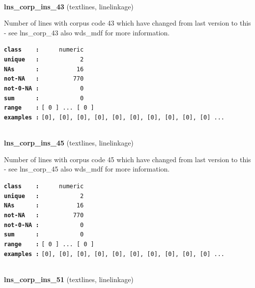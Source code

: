 \documentclass[]{article}
\begin{document}
~

\textbf{lns\_corp\_ins\_43} (textlines, linelinkage)

Number of lines with corpus code 43 which have changed from last version
to this - see lns\_corp\_43 also wds\_mdf for more information.

\textbf{\texttt{class\ \ \ \ :}} \texttt{~~~~~numeric}\\
\textbf{\texttt{unique\ \ \ :}} \texttt{~~~~~~~~~~~2}\\
\textbf{\texttt{NAs\ \ \ \ \ \ :}} \texttt{~~~~~~~~~~16}\\
\textbf{\texttt{not-NA\ \ \ :}} \texttt{~~~~~~~~~770}\\
\textbf{\texttt{not-0-NA\ :}} \texttt{~~~~~~~~~~~0}\\
\textbf{\texttt{sum\ \ \ \ \ \ :}} \texttt{~~~~~~~~~~~0}\\
\textbf{\texttt{range\ \ \ \ :}}
\texttt{{[}\ 0\ {]}\ ...\ {[}\ 0\ {]}}\\
\textbf{\texttt{examples\ :}}
\texttt{{[}0{]},\ {[}0{]},\ {[}0{]},\ {[}0{]},\ {[}0{]},\ {[}0{]},\ {[}0{]},\ {[}0{]},\ {[}0{]},\ {[}0{]}\ ...}\\

~

\textbf{lns\_corp\_ins\_45} (textlines, linelinkage)

Number of lines with corpus code 45 which have changed from last version
to this - see lns\_corp\_45 also wds\_mdf for more information.

\textbf{\texttt{class\ \ \ \ :}} \texttt{~~~~~numeric}\\
\textbf{\texttt{unique\ \ \ :}} \texttt{~~~~~~~~~~~2}\\
\textbf{\texttt{NAs\ \ \ \ \ \ :}} \texttt{~~~~~~~~~~16}\\
\textbf{\texttt{not-NA\ \ \ :}} \texttt{~~~~~~~~~770}\\
\textbf{\texttt{not-0-NA\ :}} \texttt{~~~~~~~~~~~0}\\
\textbf{\texttt{sum\ \ \ \ \ \ :}} \texttt{~~~~~~~~~~~0}\\
\textbf{\texttt{range\ \ \ \ :}}
\texttt{{[}\ 0\ {]}\ ...\ {[}\ 0\ {]}}\\
\textbf{\texttt{examples\ :}}
\texttt{{[}0{]},\ {[}0{]},\ {[}0{]},\ {[}0{]},\ {[}0{]},\ {[}0{]},\ {[}0{]},\ {[}0{]},\ {[}0{]},\ {[}0{]}\ ...}\\

~

\textbf{lns\_corp\_ins\_51} (textlines, linelinkage)
\end{document}
